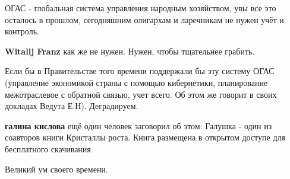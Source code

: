 \begin{minipage}{0.45\textwidth}
	
\begin{itemize}
 
ОГАС - глобальная система управления народным хозяйством, увы все это осталось в прошлом, сегодняшним олигархам и ларечникам не нужен учёт и контроль.

 
\textbf{Witalij Franz} как же не нужен. Нужен, чтобы тщательнее грабить.

 

Если бы в Правительстве того времени поддержали бы эту систему ОГАС (управление
экономикой страны с помощью кибернетики, планирование межотраслевое с обратной
связью, учет всего. Об этом же говорит в своих докладах Ведута Е.Н).
Деградируем.

\begin{itemize}
 
\textbf{галина кислова} ещё один человек заговорил об этом: Галушка - один из
соавторов книги Кристаллы роста. Книга размещена в открытом доступе для
бесплатного скачивания
\end{itemize}

 
Великий ум своего времени.

\end{itemize}
\end{minipage}

